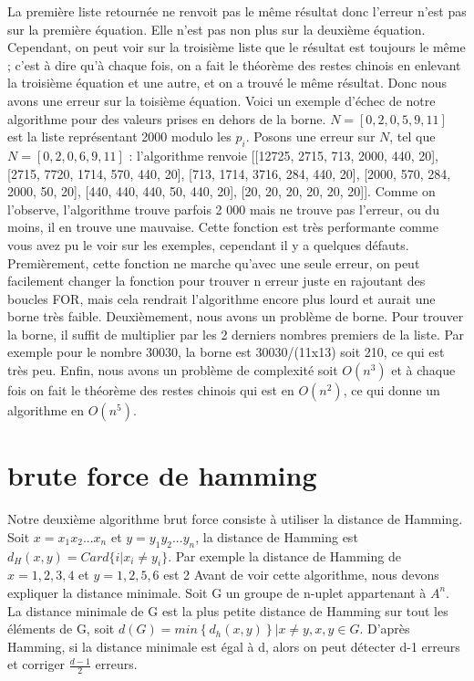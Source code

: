 \documentclass[a4paper, 11pt]{report}
\begin{document}
La première liste retournée ne renvoit pas le même résultat donc l'erreur n'est pas sur la première équation. Elle n'est pas non plus sur la deuxième équation.
Cependant, on peut voir sur la troisième liste que le résultat est toujours le même ; c'est à dire qu'à chaque fois, on a fait le théorème des restes chinois en enlevant la troisième équation et une autre, et on a trouvé le même résultat. Donc nous avons une erreur sur la toisième équation.
\newline
Voici un exemple d'échec de notre algorithme pour des valeurs prises en dehors de la borne.
$N=[0, 2, 0, 5, 9, 11]$ est la liste représentant 2000 modulo les $p_i$. Posons une erreur sur $N$, tel que $N=[0, 2, 0, 6, 9, 11]$ : l'algorithme renvoie 
[[12725, 2715, 713, 2000, 440, 20], [2715, 7720, 1714, 570, 440, 20], [713, 1714, 3716, 284, 440, 20], [2000, 570, 284, 2000, 50, 20], [440, 440, 440, 50, 440, 20], [20, 20, 20, 20, 20, 20]].
Comme on l'observe, l'algorithme trouve parfois 2 000 mais ne trouve pas l'erreur, ou du moins, il en trouve une mauvaise.
\newline
Cette fonction est très performante comme vous avez pu le voir sur les exemples, cependant il y a quelques défauts. Premièrement, cette fonction ne marche qu'avec une seule erreur,
on peut facilement changer la fonction pour trouver n erreur juste en rajoutant des boucles FOR, mais cela rendrait l'algorithme encore plus lourd et aurait une borne très faible. Deuxièmement, nous avons un problème de borne. Pour trouver la borne,
il suffit de multiplier par les 2 derniers nombres premiers de la liste. \newline
Par exemple pour le nombre 30030, la borne est 30030/(11x13) soit 210, ce qui est très peu.\newline
Enfin, nous avons un problème de complexité soit $O(n^3)$ et à chaque fois on fait le théorème des restes chinois qui est en $O(n^2)$, ce qui donne un algorithme en $O(n^5)$.




\newpage
\section{brute force de hamming}

Notre deuxième algorithme brut force consiste à utiliser la distance de Hamming. Soit $x=x_1x_2 ... x_n$ et $y=y_1y_2 ... y_n$, la distance de Hamming est
$d_H(x,y)=Card\{  i\vert x_i \neq y_i \}$. Par exemple la distance de Hamming de $x={1,2,3,4}$ et $y={1,2,5,6}$ est 2\newline
Avant de voir cette algorithme, nous devons expliquer la distance minimale. Soit G un groupe de n-uplet appartenant à $A^n$. La distance minimale de G est la plus petite distance de Hamming sur tout les éléments de G, soit $d(G)=min{\left\{d_h(x,y)\right\} | x\neq y, x,y\in G}$.
D'après Hamming, si la distance minimale est égal à d, alors on peut détecter d-1 erreurs et corriger $\frac{d-1}{2}$ erreurs. \newline
\end{document}

